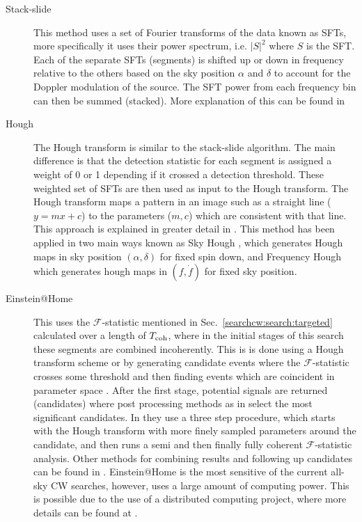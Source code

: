 \begin{description}
	
        \item[Stack-slide] This method uses a set of Fourier
transforms of the data known as \glspl{SFT}, more specifically it uses their power
spectrum, i.e. $|S|^2$ where $S$ is the \gls{SFT}. Each of the separate
\glspl{SFT} (segments) is shifted up or down in frequency relative
to the others based on the sky position $\alpha$ and $\delta$ to account for the Doppler modulation of the source. The \gls{SFT}
power from each frequency bin can then be summed (stacked). More explanation of this can be found in
\citep{brady2000SearchingPeriodic, cutler2005ImprovedStackslide}  
	
        \item[Hough] The Hough transform is similar to the stack-slide algorithm.
The main difference is that the detection statistic for each segment is
assigned a weight of 0 or 1 depending if it crossed a detection threshold. These weighted set of \glspl{SFT} are then used as input to the Hough transform.
The Hough transform maps a pattern in an image such as a straight line ($y=mx + c$) to the parameters ($m,c$) which are consistent with that line.
This approach is explained in greater detail in
\citep{krishnan2004HoughTransform,antonucci2008DetectionPeriodic}.  This method
has been applied in two main ways known as Sky Hough
\citep{krishnan2004HoughTransform}, which generates Hough maps in sky position $(\alpha,\delta)$ for fixed spin down, and Frequency Hough
\citep{antonucci2008DetectionPeriodic,astone2014MethodAllsky} which generates hough maps in $(f,\dot{f})$ for fixed sky position.
	
        \item[Einstein@Home] This uses the
$\mathcal{F}$-statistic mentioned in Sec.~\ref{searchcw:search:targeted} calculated over a length of $T_{\rm{coh}}$, where in the initial stages of this search these segments are combined incoherently. This is is done using a Hough transform scheme \citep{theligoscientificcollaborationandthevirgocollaboration2013EinsteinHome} or by generating candidate events where the $\mathcal{F}$-statistic crosses some threshold and then finding events which are coincident in parameter space \citep{ligoscientificcollaboration2009EinsteinHome}.
After the first stage, potential signals are returned (candidates) where post processing methods as in \citep{theligoscientificcollaborationandthevirgocollaboration2013EinsteinHome} select the most significant candidates.
In \citep{theligoscientificcollaborationandthevirgocollaboration2013EinsteinHome} they use a three step procedure, which starts with the Hough transform with more finely sampled parameters around the candidate, and then runs a semi and then finally fully coherent $\mathcal{F}$-statistic analysis.
Other methods for combining results and following up candidates can be found in \citep{singh2016ResultsAllsky,papa2016HierarchicalFollowup,walsh2016ComparisonMethods}.
Einstein@Home is the most sensitive of the current all-sky \gls{CW} searches,
however, uses a large amount of computing power. This is possible due to the use of a
distributed computing project, where more details can be found at
\citep{EinsteinHome}. 
	

\end{description}

